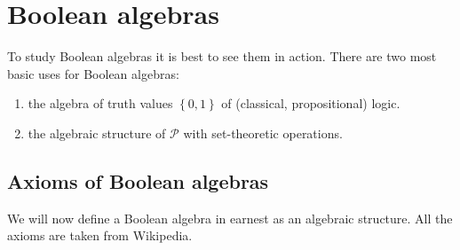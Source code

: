 \chapter{Boolean algebras}

To study Boolean algebras it is best to see them in action. There are two most basic uses for Boolean algebras:
\begin{enumerate}
    \item the algebra of truth values \( \left\{ 0, 1 \right\} \) of (classical, propositional) logic.
    \item the algebraic structure of \( \mathcal{P} \) with set-theoretic operations.
\end{enumerate}


\section{Axioms of Boolean algebras}

We will now define a Boolean algebra in earnest as an algebraic structure. All the axioms are taken from Wikipedia.

